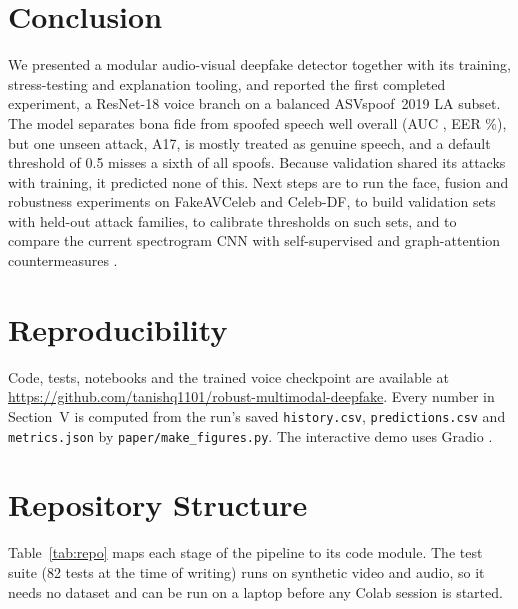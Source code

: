 \documentclass[conference]{IEEEtran}
\begin{document}
\section{Conclusion}
We presented a modular audio-visual deepfake detector together with its training, stress-testing and explanation tooling, and reported the first completed experiment, a ResNet-18 voice branch on a balanced ASVspoof~2019 LA subset. The model separates bona fide from spoofed speech well overall (AUC \AUC, EER \EER\%), but one unseen attack, A17, is mostly treated as genuine speech, and a default threshold of 0.5 misses a sixth of all spoofs. Because validation shared its attacks with training, it predicted none of this. Next steps are to run the face, fusion and robustness experiments on FakeAVCeleb and Celeb-DF, to build validation sets with held-out attack families, to calibrate thresholds on such sets, and to compare the current spectrogram CNN with self-supervised and graph-attention countermeasures \cite{jung2022aasist,tak2022wav2vec}.

\section*{Reproducibility}
Code, tests, notebooks and the trained voice checkpoint are available at \url{https://github.com/tanishq1101/robust-multimodal-deepfake}. Every number in Section~V is computed from the run's saved \texttt{history.csv}, \texttt{predictions.csv} and \texttt{metrics.json} by \texttt{paper/make\_figures.py}. The interactive demo uses Gradio \cite{abid2019gradio}.

\appendices
\section{Repository Structure}
Table~\ref{tab:repo} maps each stage of the pipeline to its code module. The test suite (82 tests at the time of writing) runs on synthetic video and audio, so it needs no dataset and can be run on a laptop before any Colab session is started.
\end{document}
